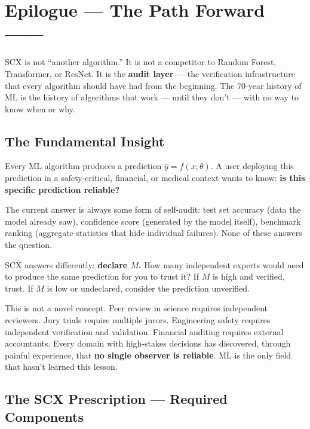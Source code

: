 \documentclass[12pt,a4paper]{article}
\theoremstyle{definition}
\newcommand{\SCX}{\textsc{SCX}}
\begin{document}
\section{Epilogue — The Path Forward ——}
\label{sec:epilogue}

\SCX{} is not ``another algorithm.'' It is not a competitor to Random Forest, Transformer, or ResNet. It is the \textbf{audit layer} — the verification infrastructure that every algorithm should have had from the beginning. The 70-year history of ML is the history of algorithms that work — until they don't — with no way to know when or why.

\subsection{The Fundamental Insight }

Every ML algorithm produces a prediction $\hat{y} = f(x; \theta)$. A user deploying this prediction in a safety-critical, financial, or medical context wants to know: \textbf{is this specific prediction reliable?}

The current answer is always some form of self-audit: test set accuracy (data the model already saw), confidence score (generated by the model itself), benchmark ranking (aggregate statistics that hide individual failures). None of these answers the question.

\SCX{} answers differently: \textbf{declare $M$.} How many independent experts would need to produce the same prediction for you to trust it? If $M$ is high and verified, trust. If $M$ is low or undeclared, consider the prediction unverified.

This is not a novel concept. Peer review in science requires independent reviewers. Jury trials require multiple jurors. Engineering safety requires independent verification and validation. Financial auditing requires external accountants. Every domain with high-stakes decisions has discovered, through painful experience, that \textbf{no single observer is reliable}. ML is the only field that hasn't learned this lesson.

\subsection{The SCX Prescription — Required Components}
\end{document}
